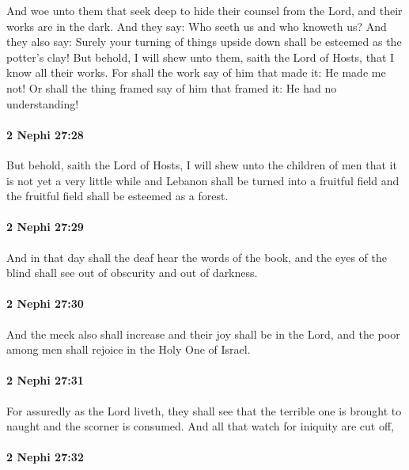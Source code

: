 			And woe unto them that seek deep to hide their counsel from the Lord,
			and their works are in the dark.
			And they say:
			Who seeth us and who knoweth us?
			And they also say:
			Surely your turning of things upside down shall be esteemed as the potter's clay!
			But behold, I will shew unto them, saith the Lord of Hosts,
			that I know all their works.
			For shall the work say of him that made it:
			He made me not!
			Or shall the thing framed say of him that framed it:
			He had no understanding!

		\paragraph{2 Nephi 27:28} %
			\label{2NEPHI-27-28}

			But behold, saith the Lord of Hosts,
			I will shew unto the children of men
			that it is not yet a very little while
			and Lebanon shall be turned into a fruitful field
			and the fruitful field shall be esteemed as a forest.

		\paragraph{2 Nephi 27:29} %
			\label{2NEPHI-27-29}

			And in that day shall the deaf hear the words of the book,
			and the eyes of the blind shall see out of obscurity and out of darkness.

		\paragraph{2 Nephi 27:30} %
			\label{2NEPHI-27-30}

			And the meek also shall increase and their joy shall be in the Lord,
			and the poor among men shall rejoice in the Holy One of Israel.

		\paragraph{2 Nephi 27:31} %
			\label{2NEPHI-27-31}

			For assuredly as the Lord liveth,
			they shall see that the terrible one is brought to naught
			and the scorner is consumed.
			And all that watch for iniquity are cut off,

		\paragraph{2 Nephi 27:32} %
			\label{2NEPHI-27-32}

